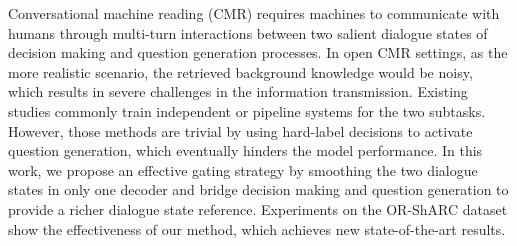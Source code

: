 Conversational machine reading (CMR) requires machines to communicate with humans through multi-turn interactions between two salient dialogue states of decision making and question generation processes. In open CMR settings, as the more realistic scenario, the retrieved background knowledge would be noisy, which results in severe challenges in the information transmission. Existing studies commonly train independent or pipeline systems for the two subtasks. However, those methods are trivial by using hard-label decisions to activate question generation, which eventually hinders the model performance. In this work, we propose an effective gating strategy by smoothing the two dialogue states in only one decoder and bridge decision making and question generation to provide a richer dialogue state reference. Experiments on the OR-ShARC dataset show the effectiveness of our method, which achieves new state-of-the-art results.
